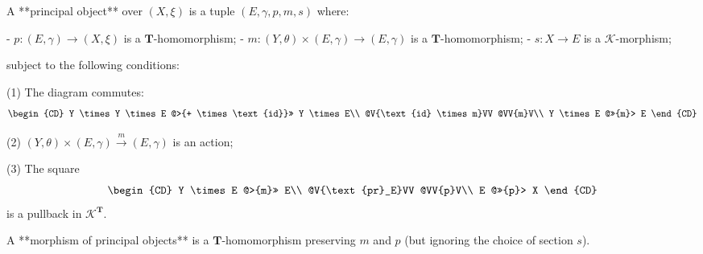 A **principal object** over $(X, \xi)$ is a tuple $(E, \gamma, p, m, s)$ where:

- $p: (E, \gamma) \rightarrow (X, \xi)$ is a $\mathbf{T}$-homomorphism;
- $m: (Y, \theta) \times (E, \gamma) \rightarrow (E, \gamma)$ is a $\mathbf{T}$-homomorphism;
- $s: X \rightarrow E$ is a $\mathcal{K}$-morphism;

subject to the following conditions:

(1) The diagram commutes:
\[
\begin{CD}
Y \times Y \times E @>{+ \times \text{id}}>> Y \times E\\
@V{\text{id} \times m}VV @VV{m}V\\
Y \times E @>>{m}> E
\end{CD}
\]

(2) $(Y, \theta) \times (E, \gamma) \xrightarrow{m} (E, \gamma)$ is an action;

(3) The square
\[
\begin{CD}
Y \times E @>{m}>> E\\
@V{\text{pr}_E}VV @VV{p}V\\
E @>>{p}> X
\end{CD}
\]
is a pullback in $\mathcal{K}^{\mathbf{T}}$.

A **morphism of principal objects** is a $\mathbf{T}$-homomorphism preserving $m$ and $p$ (but ignoring the choice of section $s$).
